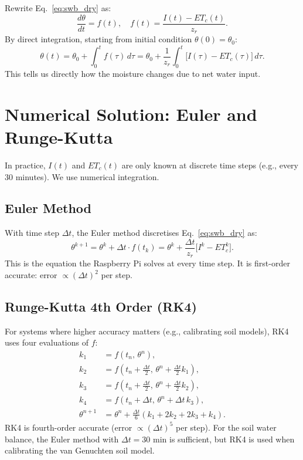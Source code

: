 \documentclass[12pt,a4paper,openany]{book}
\begin{document}
Rewrite Eq.~\eqref{eq:swb_dry} as:
\begin{equation}
  \frac{d\theta}{dt} = f(t),\quad f(t) = \frac{I(t)-ET_c(t)}{z_r}.
\end{equation}
By direct integration, starting from initial condition $\theta(0)=\theta_0$:
\begin{equation}
  \boxed{\theta(t) = \theta_0 + \int_0^t f(\tau)\,d\tau = \theta_0 + \frac{1}{z_r}\int_0^t\bigl[I(\tau)-ET_c(\tau)\bigr]\,d\tau.}
  \label{eq:theta_solution}
\end{equation}
This tells us directly how the moisture changes due to net water input.

\section{Numerical Solution: Euler and Runge-Kutta}

In practice, $I(t)$ and $ET_c(t)$ are only known at discrete time steps (e.g., every 30 minutes). We use numerical integration.

\subsection{Euler Method}

With time step $\Delta t$, the Euler method discretises Eq.~\eqref{eq:swb_dry} as:
\begin{equation}
  \theta^{k+1} = \theta^k + \Delta t \cdot f(t_k)
  = \theta^k + \frac{\Delta t}{z_r}\bigl[I^k - ET_c^k\bigr].
  \label{eq:euler}
\end{equation}
This is the equation the Raspberry Pi solves at every time step. It is first-order accurate: error $\propto (\Delta t)^2$ per step.

\subsection{Runge-Kutta 4th Order (RK4)}

For systems where higher accuracy matters (e.g., calibrating soil models), RK4 uses four evaluations of $f$:
\begin{align}
  k_1 &= f(t_n,\,\theta^n),\\
  k_2 &= f\!\left(t_n+\tfrac{\Delta t}{2},\,\theta^n+\tfrac{\Delta t}{2}k_1\right),\\
  k_3 &= f\!\left(t_n+\tfrac{\Delta t}{2},\,\theta^n+\tfrac{\Delta t}{2}k_2\right),\\
  k_4 &= f\!\left(t_n+\Delta t,\,\theta^n+\Delta t\,k_3\right),\\
  \theta^{n+1} &= \theta^n + \frac{\Delta t}{6}(k_1+2k_2+2k_3+k_4).
\end{align}
RK4 is fourth-order accurate (error $\propto(\Delta t)^5$ per step). For the soil water balance, the Euler method with $\Delta t=30$ min is sufficient, but RK4 is used when calibrating the van Genuchten soil model.
\end{document}
